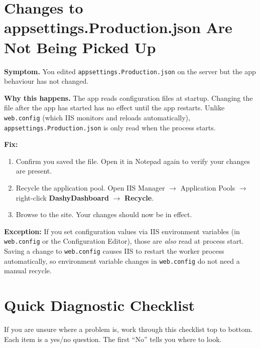 \documentclass[a4paper,11pt]{article}
\begin{document}
\section{Changes to appsettings.Production.json Are Not Being Picked Up}
\label{sec:settingsnotpicked}

\textbf{Symptom.}
You edited \texttt{appsettings.Production.json} on the server but the app
behaviour has not changed.

\textbf{Why this happens.}
The app reads configuration files at startup.
Changing the file after the app has started has no effect until the app restarts.
Unlike \texttt{web.config} (which IIS monitors and reloads automatically),
\texttt{appsettings.Production.json} is only read when the process starts.

\textbf{Fix:}

\begin{enumerate}
  \item Confirm you saved the file.
        Open it in Notepad again to verify your changes are present.
  \item Recycle the application pool.
        Open IIS Manager $\rightarrow$ Application Pools $\rightarrow$
        right-click \textbf{DashyDashboard} $\rightarrow$ \textbf{Recycle}.
  \item Browse to the site.
        Your changes should now be in effect.
\end{enumerate}

\begin{infobox}
\textbf{Exception:} If you set configuration values via IIS environment variables
(in \texttt{web.config} or the Configuration Editor), those are \emph{also}
read at process start.
Saving a change to \texttt{web.config} causes IIS to restart the worker process
automatically, so environment variable changes in \texttt{web.config}
do not need a manual recycle.
\end{infobox}

\section{Quick Diagnostic Checklist}
\label{sec:quickcheck}

If you are unsure where a problem is, work through this checklist top to bottom.
Each item is a yes/no question.
The first ``No'' tells you where to look.
\end{document}
